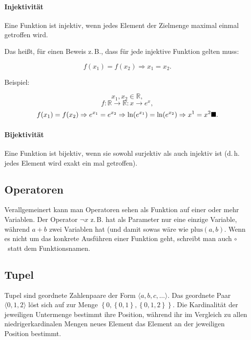 \documentclass{scrartcl}
\newcommand*{\QEDA}{\hfill\ensuremath{\blacksquare}}%
\begin{document}
\paragraph{Injektivität} Eine Funktion ist injektiv,
wenn jedes Element der Zielmenge maximal einmal getroffen wird.

Das heißt, für einen Beweis z.\,B., dass für jede injektive Funktion gelten muss:

\begin{equation}
	f(x_1) = f(x_2) \Rightarrow x_1 = x_2.
\end{equation}

Beispiel:

\begin{equation}
	x_1, x_2 \in \mathbb{R},
\end{equation}
\begin{equation}
	f: \mathbb{R} \rightarrow \mathbb{R}: x \longrightarrow e^x,
\end{equation}
\begin{equation}
	f(x_1) = f(x_2) \Rightarrow e^{x_1} = e^{x_2} \Rightarrow \ln(e^{x_1}) = \ln(e^{x_2}) \Rightarrow x^1 = x^2 \QEDA.
\end{equation}

\paragraph{Bijektivität} Eine Funktion ist bijektiv, wenn sie sowohl surjektiv als auch
injektiv ist (d.\,h. jedes Element wird exakt ein mal getroffen).


\subsection{Operatoren}

Verallgemeinert kann man Operatoren sehen als Funktion auf einer oder mehr Variablen. Der Operator $\lnot x$ z.\,B. hat als Parameter
nur eine einzige Variable, während $a + b$ zwei Variablen hat (und damit sowas wäre wie $\textrm{plus}(a, b)$. Wenn es nicht um das
konkrete Ausführen einer Funktion geht, schreibt man auch \frq$\circ$\flq\ statt dem Funktionsnamen.

\subsection{Tupel}

Tupel sind geordnete Zahlenpaare der Form $\langle a, b, c, \dots\rangle$. Das geordnete Paar
$\langle 0, 1, 2\rangle$ löst sich auf zur Menge $\left\{0, \left\{0, 1\right\}, \left\{0, 1, 2\right\}\right\}$.
Die Kardinalität der jeweiligen Untermenge bestimmt ihre Position, während ihr im Vergleich zu allen niedrigerkardinalen
Mengen neues Element das Element an der jeweiligen Position bestimmt.
\end{document}
